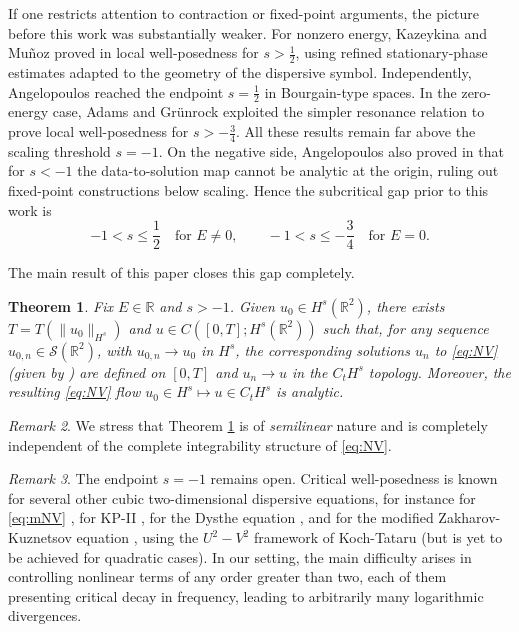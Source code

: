 \documentclass[a4paper,
11pt,  reqno]{amsart}
\newcommand{\5}{\textup{V}}
\newtheorem{theorem}{Theorem} [section]
\theoremstyle{remark}
\newtheorem{remark}[theorem]{Remark}
\newcommand{\R}{\mathbb{R}}
\numberwithin{equation}{section}
\numberwithin{theorem}{section}
\begin{document}
\medskip



If one restricts attention to contraction or fixed-point arguments, the picture before this
work was substantially weaker. For nonzero energy, Kazeykina and Mu\~noz proved in
\cite{kazeykinamunoz1, kazeykinamunoz2} local well-posedness for $s>\frac12$, using
refined stationary-phase estimates adapted to the geometry of the dispersive symbol. Independently,
Angelopoulos \cite{angelopolous} reached the endpoint $s=\frac12$ in Bourgain-type
spaces. In the zero-energy case, Adams and Gr\"unrock \cite{adamsgrunrock} exploited the
simpler resonance relation to prove local well-posedness for $s>-\frac34$. All these
results remain far above the scaling threshold $s=-1$. On the negative side,
Angelopoulos also proved in \cite{angelopolous} that for $s<-1$ the data-to-solution map
cannot be analytic at the origin, ruling out fixed-point constructions below scaling.
Hence the subcritical gap prior to this work is
\[
-1< s\le \frac12 \quad \text{for } E\neq 0,
\qquad
-1< s\le -\frac34 \quad \text{for } E=0.
\]

\medskip



The main result of this paper closes this gap completely.


\begin{theorem}\label{thm:main_intro}
    Fix $E\in\R$ and $s>-1$. Given $u_0\in H^s(\R^2)$, there exists $T=T(\|u_0\|_{H^s})$ and $u\in C([0,T]; H^s(\R^2))$ such that, for any sequence $u_{0,n}\in \mathcal{S}(\R^2)$, with $u_{0,n}\to u_0$ in $H^s$, the corresponding solutions $u_n$ to \eqref{eq:NV} (given by \cite{angelopolous, kazeykinamunoz1, kazeykinamunoz2}) are defined on $[0,T]$ and $u_n\to u$ in the $C_tH^s$ topology. Moreover, the resulting \eqref{eq:NV} flow $u_0\in H^s\mapsto u\in C_tH^s$ is analytic.
\end{theorem}


\begin{remark}
We stress that Theorem \ref{thm:main_intro} is of \emph{semilinear} nature and is
completely independent of the complete integrability structure of \eqref{eq:NV}.
\end{remark}


\begin{remark}
The endpoint $s=-1$ remains open. Critical well-posedness is known for several other
cubic two-dimensional dispersive equations, for instance for \eqref{eq:mNV}
\cite{Schottdorf}, for KP-II \cite{HHK}, for the Dysthe equation \cite{MPS_Dysthe}, and
for the modified Zakharov-Kuznetsov equation \cite{CorreiaKinoshita}, using the $U^2-V^2$ framework of Koch-Tataru \cite{KochTataru} (but is yet to be achieved for quadratic cases). In our setting, the main difficulty arises in controlling nonlinear terms of any order greater than two, each of them presenting critical decay in frequency, leading to arbitrarily many logarithmic divergences.
\end{remark}
\end{document}
